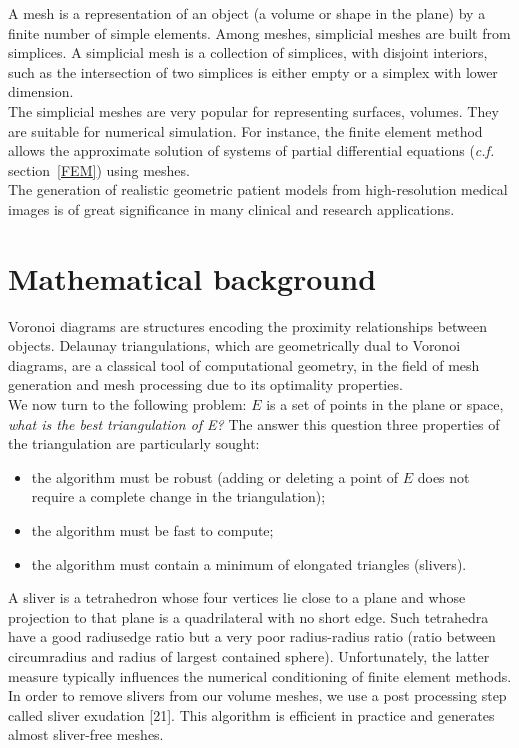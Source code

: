 A mesh is a representation of an object (a volume or shape in the plane) by a finite number of simple elements. Among meshes, simplicial meshes are built from simplices. A simplicial mesh is a collection of simplices, with disjoint interiors, such as the intersection of two simplices is either empty or a simplex with lower dimension. \\
The simplicial meshes are very popular for representing surfaces, volumes. They are suitable for numerical simulation. For instance, the finite element method allows the approximate solution of systems of partial differential equations ({\it c.f.} section~\ref{FEM}) using meshes. \\
The generation of realistic geometric patient models from high-resolution medical images is of great significance in many clinical and research applications. 

\newpage


\section{Mathematical background}

Voronoi diagrams are structures encoding the proximity relationships between objects. Delaunay triangulations, which are geometrically dual to Voronoi diagrams, are a classical tool of computational geometry, in the field of mesh generation and mesh processing due to its optimality properties.\\
We now turn to the following problem: $E$ is a set of points in the plane or space, {\it what is the best triangulation of E?} The answer this question three properties of the triangulation are particularly sought: \\

\begin {itemize}
\item the algorithm must be robust (adding or deleting a point of $E$ does not require a complete change in the triangulation);
\item the algorithm must be fast to compute;
\item the algorithm must contain a minimum of elongated triangles (slivers). \\
\end {itemize}

A sliver is a tetrahedron whose four vertices lie close to a plane and whose projection to that plane is a quadrilateral with no short edge. Such tetrahedra have a good radiusedge ratio but a very poor radius-radius ratio (ratio between circumradius and radius of largest contained sphere). Unfortunately, the latter measure typically influences the numerical conditioning of finite element methods. In order to remove slivers from our volume meshes, we use a post processing step called sliver exudation [21]. This algorithm is efficient in practice and generates almost sliver-free meshes.

